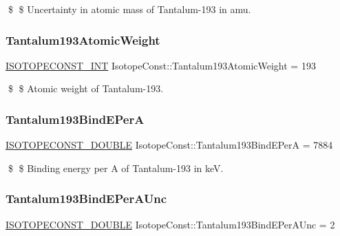\$ \$ Uncertainty in atomic mass of Tantalum-\/193 in amu. \mbox{\label{group___isotope_const-_tantalum-_ta193_gab11300c17872c76bc4e9cc7c91477cfe}} 
\subsubsection{\texorpdfstring{Tantalum193\+Atomic\+Weight}{Tantalum193AtomicWeight}}
{\footnotesize\ttfamily \mbox{\hyperlink{group___isotope_const-_macros_ga5f18360b3e99483a35c32d789e62621c}{I\+S\+O\+T\+O\+P\+E\+C\+O\+N\+S\+T\+\_\+\+I\+NT}} Isotope\+Const\+::\+Tantalum193\+Atomic\+Weight = 193}

\$ \$ Atomic weight of Tantalum-\/193. \mbox{\label{group___isotope_const-_tantalum-_ta193_gaef5473a424f5d248668498d13efa47f5}} 
\subsubsection{\texorpdfstring{Tantalum193\+Bind\+E\+PerA}{Tantalum193BindEPerA}}
{\footnotesize\ttfamily \mbox{\hyperlink{group___isotope_const-_macros_ga8f45a7272ce02c0b4c65c44636ed719a}{I\+S\+O\+T\+O\+P\+E\+C\+O\+N\+S\+T\+\_\+\+D\+O\+U\+B\+LE}} Isotope\+Const\+::\+Tantalum193\+Bind\+E\+PerA = 7884}

\$ \$ Binding energy per A of Tantalum-\/193 in keV. \mbox{\label{group___isotope_const-_tantalum-_ta193_ga53789b7c27f6081f362dc27e270db490}} 
\subsubsection{\texorpdfstring{Tantalum193\+Bind\+E\+Per\+A\+Unc}{Tantalum193BindEPerAUnc}}
{\footnotesize\ttfamily \mbox{\hyperlink{group___isotope_const-_macros_ga8f45a7272ce02c0b4c65c44636ed719a}{I\+S\+O\+T\+O\+P\+E\+C\+O\+N\+S\+T\+\_\+\+D\+O\+U\+B\+LE}} Isotope\+Const\+::\+Tantalum193\+Bind\+E\+Per\+A\+Unc = 2}

